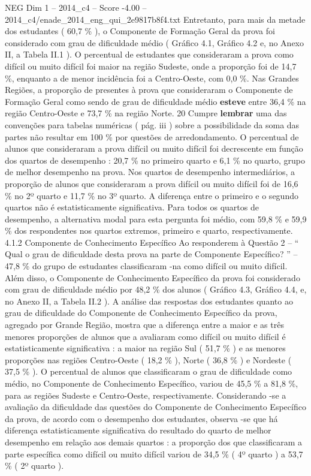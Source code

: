 \begin{textsample}{NEG Dim 1 – 2014\_c4 – Score -4.00 – 2014\_c4/enade\_2014\_eng\_qui\_2e9817b8f4.txt}
Entretanto, para mais da metade dos estudantes ( 60,7 \% ), o Componente de Formação Geral da prova foi considerado com grau de dificuldade médio ( Gráfico 4.1, Gráfico 4.2 e, no Anexo II, a Tabela II.1 ).
O percentual de estudantes que consideraram a prova como difícil ou muito difícil foi maior na região Sudeste, onde a proporção foi de 14,7 \%, enquanto a de menor incidência foi a Centro-Oeste, com 0,0 \%.
Nas Grandes Regiões, a proporção de presentes à prova que consideraram o Componente de Formação Geral como sendo de grau de dificuldade médio \textbf{esteve} entre 36,4 \% na região Centro-Oeste e 73,7 \% na região Norte. 20 Cumpre \textbf{lembrar} uma das convenções para tabelas numéricas ( pág. iii ) sobre a possibilidade da soma das partes não resultar em 100 \% por questões de arredondamento.
O percentual de alunos que consideraram a prova difícil ou muito difícil foi decrescente em função dos quartos de desempenho : 20,7 \% no primeiro quarto e 6,1 \% no quarto, grupo de melhor desempenho na prova.
Nos quartos de desempenho intermediários, a proporção de alunos que consideraram a prova difícil ou muito difícil foi de 16,6 \% no 2º quarto e 11,7 \% no 3º quarto.
A diferença entre o primeiro e o segundo quartos não é estatisticamente significativa.
Para todos os quartos de desempenho, a alternativa modal para esta pergunta foi médio, com 59,8 \% e 59,9 \% dos respondentes nos quartos extremos, primeiro e quarto, respectivamente. 4.1.2 Componente de Conhecimento Específico Ao responderem à Questão 2 – “ Qual o grau de dificuldade desta prova na parte de Componente Específico? ” – 47,8 \% do grupo de estudantes classificaram -na como difícil ou muito difícil.
Além disso, o Componente de Conhecimento Específico da prova foi considerado com grau de dificuldade médio por 48,2 \% dos alunos ( Gráfico 4.3, Gráfico 4.4, e, no Anexo II, a Tabela II.2 ).
A análise das respostas dos estudantes quanto ao grau de dificuldade do Componente de Conhecimento Específico da prova, agregado por Grande Região, mostra que a diferença entre a maior e as três menores proporções de alunos que a avaliaram como difícil ou muito difícil é estatisticamente significativa : a maior na região Sul ( 51,7 \% ) e as menores proporções nas regiões Centro-Oeste ( 18,2 \% ), Norte ( 36,8 \% ) e Nordeste ( 37,5 \% ).
O percentual de alunos que classificaram o grau de dificuldade como médio, no Componente de Conhecimento Específico, variou de 45,5 \% a 81,8 \%, para as regiões Sudeste e Centro-Oeste, respectivamente.
Considerando -se a avaliação da dificuldade das questões do Componente de Conhecimento Específico da prova, de acordo com o desempenho dos estudantes, observa -se que há diferença estatisticamente significativa do resultado do quarto de melhor desempenho em relação aos demais quartos : a proporção dos que classificaram a parte específica como difícil ou muito difícil variou de 34,5 \% ( 4º quarto ) a 53,7 \% ( 2º quarto ).

\end{textsample}
